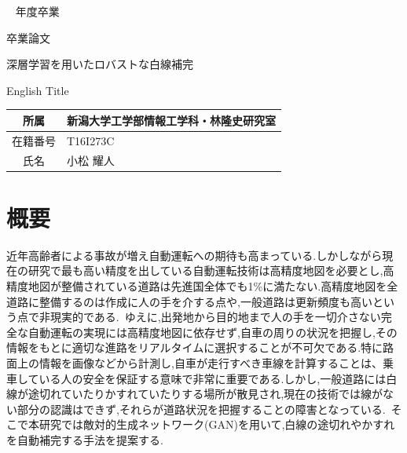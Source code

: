 \documentclass[a4j, 11pt]{jreport}
\newcounter{fiscal_year}         %
\begin{document}
\begin{titlepage}\Large ~
{\normalsize \the\value{fiscal_year} 年度卒業}
\vfill
\begin{center}

{\Huge 卒業論文}
\end{center}
\begin{center}

深層学習を用いたロバストな白線補完
\end{center}
\begin{center}

English Title
\end{center}
\vfill
\begin{center}
\begin{tabular}{|c|l|}
\hline

所属 & 新潟大学工学部情報工学科・林隆史研究室 \\
\hline

在籍番号 & T16I273C \\
\hline

氏名 & 小松 耀人 \\
\hline
\end{tabular}
\end{center}
\vspace{1cm}
\vfill
\end{titlepage}
\pagebreak
\addtocounter{page}{1}
\thispagestyle{empty}  %

\section*{概要}
 近年高齢者による事故が増え自動運転への期待も高まっている.しかしながら現在の研究で最も高い精度を出している自動運転技術は高精度地図を必要とし,高精度地図が整備されている道路は先進国全体でも1\%に満たない.高精度地図を全道路に整備するのは作成に人の手を介する点や,一般道路は更新頻度も高いという点で非現実的である. ゆえに,出発地から目的地まで人の手を一切介さない完全な自動運転の実現には高精度地図に依存せず,自車の周りの状況を把握し,その情報をもとに適切な進路をリアルタイムに選択することが不可欠である.特に路面上の情報を画像などから計測し,自車が走行すべき車線を計算することは、乗車している人の安全を保証する意味で非常に重要である.しかし,一般道路には白線が途切れていたりかすれていたりする場所が散見され,現在の技術では線がない部分の認識はできず,それらが道路状況を把握することの障害となっている. そこで本研究では敵対的生成ネットワーク(GAN)を用いて,白線の途切れやかすれを自動補完する手法を提案する.
\end{document}
